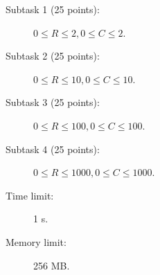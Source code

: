 \documentclass{../../../latex/boi2014}
\begin{document}
    \begin{description}
        \item[Subtask 1 (25 points):] $0 \le R \le 2, 0 \le C \le 2$.
        \item[Subtask 2 (25 points):] $0 \le R \le 10, 0 \le C \le 10$.
        \item[Subtask 3 (25 points):] $0 \le R \le 100, 0 \le C \le 100$.
        \item[Subtask 4 (25 points):] $0 \le R \le 1000, 0 \le C \le 1000$.
    \end{description}

    \Constraints

    \begin{description}
        \item[Time limit:] 1 s.
        \item[Memory limit:] 256 MB.
    \end{description}

\end{document}
